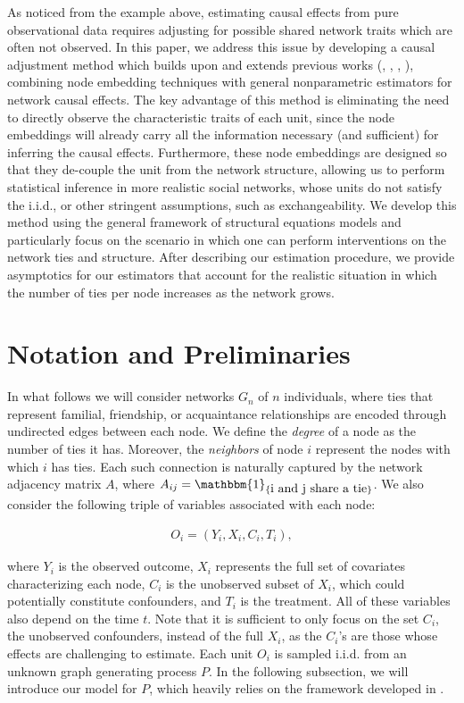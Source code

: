 \documentclass{article}
\begin{document}
As noticed from the example above, estimating causal effects from pure observational data requires adjusting for possible shared network traits which are often not observed. In this paper, we address this issue by developing a causal adjustment method which builds upon and extends previous works (\cite{Veitch:Wang:Blei:2019}, \cite{Ogburn:VanderWeele:2017}, \cite{Ogburn:2018}, \cite{Ogburn:Sofrygin:Diaz:vanderLaan:2017}), combining node embedding techniques with general nonparametric estimators for network causal effects. The key advantage of this method is eliminating the need to directly observe the characteristic traits of each unit, since the node embeddings will already carry all the information necessary (and sufficient) for inferring the causal effects. Furthermore, these node embeddings are designed so that they de-couple the unit from the network structure, allowing us to perform statistical inference in more realistic social networks, whose units do not satisfy the i.i.d., or other stringent assumptions, such as exchangeability. We develop this method using the general framework of structural equations models and particularly focus on the scenario in which one can perform interventions on the network ties and structure. After describing our estimation procedure, we provide asymptotics for our estimators that account for the realistic situation in which the number of ties per node increases as the network grows. 


\section{Notation and Preliminaries}

In what follows we will consider networks $G_n$ of $n$ individuals, where ties that represent familial, friendship, or acquaintance relationships are encoded through undirected edges between each node. We define the \textit{degree} of a node as the number of ties it has. Moreover, the \textit{neighbors} of node $i$ represent the nodes with which $i$ has ties. Each such connection is naturally captured by the network adjacency matrix $A$, where $A_{ij} = \mathbbm{1}_{\{\mbox{i and j share a tie}\}}$. We also consider the following triple of variables associated with each node:

\begin{align*}
O_i = (Y_i, X_i, C_i, T_i),
\end{align*}

\noindent where $Y_i$ is the observed outcome, $X_i$ represents the full set of covariates characterizing each node, $C_i$ is the unobserved subset of $X_i$, which could potentially constitute confounders, and $T_i$ is the treatment. All of these variables also depend on the time $t$. Note that it is sufficient to only focus on the set $C_i$, the unobserved confounders, instead of the full $X_i$, as the $C_i$'s are those whose effects are challenging to estimate. Each unit $O_i$ is sampled i.i.d. from an unknown graph generating process $P$. In the following subsection, we will introduce our model for $P$, which heavily relies on the framework developed in \cite{Ogburn:Sofrygin:Diaz:vanderLaan:2017}. 
\end{document}
